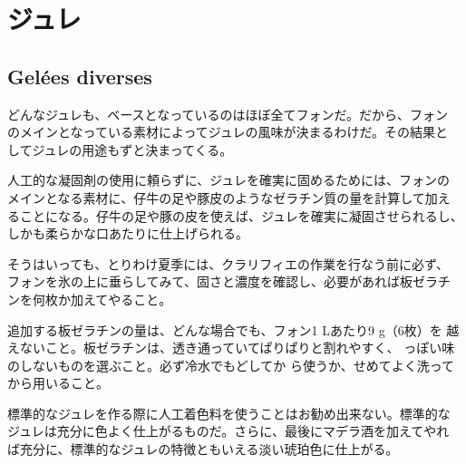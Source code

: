 \hypertarget{ux30b8ux30e5ux30ec}{%
\section{ジュレ}\label{ux30b8ux30e5ux30ec}}

\hypertarget{gelees-diverses}{%
\subsection{Gelées diverses}\label{gelees-diverses}}

 

どんなジュレも、ベースとなっているのはほぼ全てフォンだ。だから、フォン
のメインとなっている素材によってジュレの風味が決まるわけだ。その結果と
してジュレの用途もずと決まってくる。

人工的な凝固剤の使用に頼らずに、ジュレを確実に固めるためには、フォンの
メインとなる素材に、仔牛の足や豚皮のようなゼラチン質の量を計算して加え
ることになる。仔牛の足や豚の皮を使えば、ジュレを確実に凝固させられるし、
しかも柔らかな口あたりに仕上げられる。

そうはいっても、とりわけ夏季には、クラリフィエの作業を行なう前に必ず、
フォンを氷の上に垂らしてみて、固さと濃度を確認し、必要があれば板ゼラチ
ンを何枚か加えてやること。

追加する板ゼラチンの量は、どんな場合でも、フォン1 Lあたり9 g（6枚）を
越えないこと。板ゼラチンは、透き通っていてぱりぱりと割れやすく、
っぽい味のしないものを選ぶこと。必ず冷水でもどしてか
ら使うか、せめてよく洗ってから用いること。

標準的なジュレを作る際に人工着色料を使うことはお勧め出来ない。標準的な
ジュレは充分に色よく仕上がるものだ。さらに、最後にマデラ酒を加えてやれ
ば充分に、標準的なジュレの特徴ともいえる淡い琥珀色に仕上がる。

